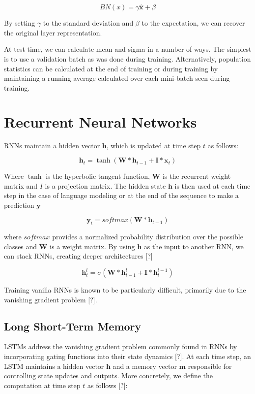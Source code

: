 \documentclass{article}
\def\x{{\mathbf x}}
\begin{document}
\begin{equation}
	BN(x) = \gamma \hat \x + \beta
\end{equation}

By setting $\gamma$ to the standard deviation and $\beta$ to the expectation, we can recover the original layer representation.

At test time, we can calculate mean and sigma in a number of ways. The simplest is to use a validation batch as was done during training. Alternatively, population statistics can be calculated at the end of training or during training by maintaining a running average calculated over each mini-batch seen during training.

\section{Recurrent Neural Networks}
RNNs maintain a hidden vector $\boldsymbol h$, which is updated at time step $t$ as follows:
 
\begin{equation}
	\boldsymbol h_t = \tanh(\boldsymbol W * \boldsymbol h_{t-1} + \boldsymbol I * \x_t) \nonumber
\end{equation}

Where $\tanh$ is the hyperbolic tangent function, $\boldsymbol W$ is the recurrent weight matrix and $I$ is a projection matrix. The hidden state $\boldsymbol h$ is then used at each time step in the case of language modeling or at the end of the sequence to make a prediction $\boldsymbol y$

\begin{equation}
	\boldsymbol y_t = softmax(\boldsymbol W * \boldsymbol h_{t-1}) \nonumber
\end{equation}

where $softmax$ provides a normalized probability distribution over the possible classes and $\boldsymbol W$ is a weight matrix. By using $\boldsymbol h$ as the input to another RNN, we can stack RNNs, creating deeper architectures [?]

\begin{equation}
	\boldsymbol h_t^{l} = \sigma(\boldsymbol W * \boldsymbol h_{t-1}^{l} + \boldsymbol I * \boldsymbol h_t^{l-1}) \nonumber
\end{equation}

Training vanilla RNNs is known to be particularly difficult, primarily due to the vanishing gradient problem [?].

\subsection{Long Short-Term Memory}
LSTMs address the vanishing gradient problem commonly found in RNNs by incorporating gating functions into their state dynamics [?]. At each time step, an LSTM maintains a hidden vector $\boldsymbol h$ and a memory vector $\boldsymbol m$  responsible for controlling state updates and outputs. More concretely, we define the computation at time step $t$ as follows [?]:
\end{document}
